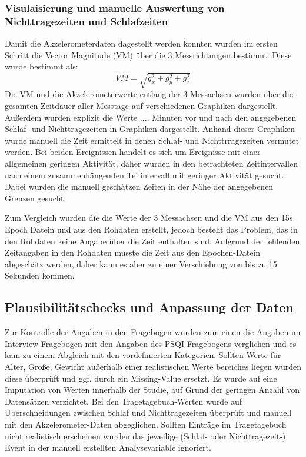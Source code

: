 \subsubsection{Visulaisierung und manuelle Auswertung von Nichttragezeiten und Schlafzeiten}
Damit die Akzelerometerdaten dagestellt werden konnten wurden im ersten Schritt die Vector Magnitude (VM) über die 3 Messrichtungen bestimmt. Diese wurde bestimmt als: $$VM = \sqrt{g_{x}^2 + g_{y}^2 + g_{z}^2} $$ Die VM und die Akzelerometerwerte entlang der 3 Messachsen wurden über die gesamten Zeitdauer aller Messtage auf verschiedenen Graphiken dargestellt. Außerdem wurden explizit die Werte .... Minuten vor und nach den angegebenen Schlaf- und Nichttragezeiten in Graphiken dargestellt. Anhand dieser Graphiken wurde manuell die Zeit ermittelt in denen Schlaf- und Nichttrragezeiten vermutet werden. Bei beiden Ereignissen handelt es sich um Ereignisse mit einer allgemeinen geringen Aktivität, daher wurden in den betrachteten Zeitintervallen nach einem zusammenhängenden Teilintervall mit geringer Aktivität gesucht. Dabei wurden die manuell geschätzen Zeiten in der Nähe der angegebenen Grenzen gesucht.

Zum Vergleich wurden die die Werte der 3 Messachsen und die VM aus den 15s Epoch Datein und aus den Rohdaten erstellt, jedoch besteht das Problem, das in den Rohdaten keine Angabe über die Zeit enthalten sind. Aufgrund der fehlenden Zeitangaben in den Rohdaten musste die Zeit aus den Epochen-Datein abgeschätz werden, daher kann es aber zu einer Verschiebung von bis zu 15 Sekunden kommen.



\subsection{Plausibilitätschecks und Anpassung der Daten}

Zur Kontrolle der Angaben in den Fragebögen wurden zum einen die Angaben im Interview-Fragebogen mit den Angaben des PSQI-Fragebogens verglichen und es kam zu einem Abgleich mit den vordefinierten Kategorien. Sollten Werte für Alter, Größe, Gewicht außerhalb einer realistischen Werte bereiches liegen wurden diese überprüft und ggf. durch ein Missing-Value ersetzt.
Es wurde auf eine Imputation von Werten innerhalb der Studie, auf Grund der geringen Anzahl von Datensätzen verzichtet. 
Bei den Tragetagebuch-Werten wurde auf Überschneidungen zwischen Schlaf und Nichttragezeiten überprüft und manuell mit den Akzelerometer-Daten abgeglichen. Sollten Einträge im Tragetagebuch nicht realistisch erscheinen wurden das jeweilige (Schlaf- oder Nichttragezeit-) Event in der manuell erstellten Analysevariable ignoriert. 


